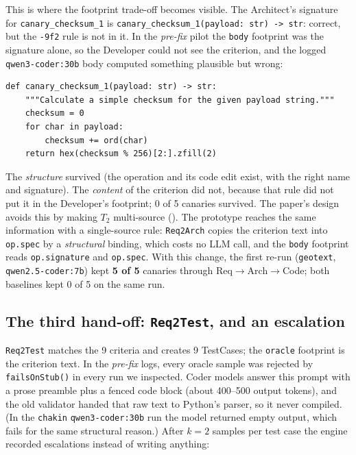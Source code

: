 \documentclass[10pt,a4paper]{article}
\newcommand{\cls}[1]{\textsf{#1}}
\newcommand{\code}[1]{\texttt{#1}}
\theoremstyle{definition}
\begin{document}
This is where the footprint trade-off becomes visible. The Architect's
signature for \code{canary_checksum_1} is \code{canary_checksum_1(payload:
str) -> str}: correct, but the \code{-9f2} rule is not in it. In the
\emph{pre-fix} pilot the \code{body} footprint was the signature alone, so the
Developer could not see the criterion, and the logged \texttt{qwen3-coder:30b}
body computed something plausible but wrong:

\begin{lstlisting}[style=llm, caption={Pre-fix logged body for \code{canary_checksum_1} (qwen3-coder:30b, signature-only footprint).}]
def canary_checksum_1(payload: str) -> str:
    """Calculate a simple checksum for the given payload string."""
    checksum = 0
    for char in payload:
        checksum += ord(char)
    return hex(checksum % 256)[2:].zfill(2)
\end{lstlisting}

The \emph{structure} survived (the operation and its code edit exist, with
the right name and signature). The \emph{content} of the criterion did not,
because that rule did not put it in the Developer's footprint; 0 of 5
canaries survived. The paper's design avoids this by making $T_2$
multi-source (). The prototype reaches the same
information with a single-source rule: \code{Req2Arch} copies the criterion
text into \code{op.spec} by a \emph{structural} binding, which costs no LLM
call, and the \code{body} footprint reads \code{op.signature} and
\code{op.spec}. With this change, the first re-run
(\texttt{geotext}, \texttt{qwen2.5-coder:7b}) kept \textbf{5 of 5} canaries
through Req$\to$Arch$\to$Code; both baselines kept 0 of 5 on the same run.

\subsection{The third hand-off: \code{Req2Test}, and an escalation}

\code{Req2Test} matches the 9 criteria and creates 9 \cls{TestCase}s; the
\code{oracle} footprint is the criterion text. In the \emph{pre-fix} logs,
every oracle sample was rejected by \code{failsOnStub()} in every run we
inspected. Coder models answer this prompt with a prose preamble plus a fenced
code block (about 400--500 output tokens), and the old validator handed that
raw text to Python's parser, so it never compiled. (In the \texttt{chakin}
\texttt{qwen3-coder:30b} run the model returned empty output, which fails for
the same structural reason.) After $k=2$ samples per test case the engine
recorded escalations instead of writing anything:
\end{document}

